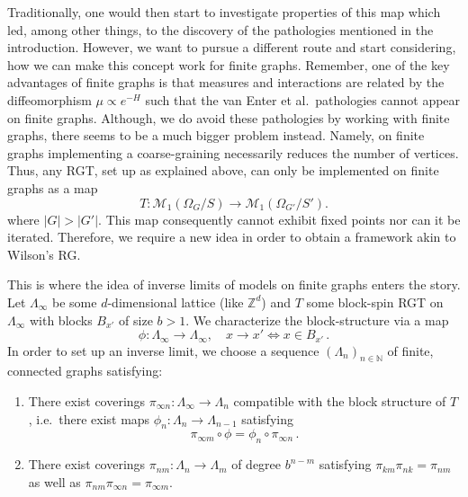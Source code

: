 \documentclass{article}
\begin{document}
Traditionally, one would then start to investigate properties of this map which led, among other things, to the discovery of the pathologies mentioned in the introduction. However, we want to pursue a different route and start considering, how we can make this concept work for finite graphs. Remember, one of the key advantages of finite graphs is that measures and interactions are related by the diffeomorphism $\mu\propto e^{-H}$ such that the van Enter et al.\ pathologies cannot appear on finite graphs. Although, we do avoid these pathologies by working with finite graphs, there seems to be a much bigger problem instead. Namely, on finite graphs implementing a coarse-graining necessarily reduces the number of vertices. Thus, any RGT, set up as explained above, can only be implemented on finite graphs as a map
\begin{equation}
    T:\mathscr{M}_1(\Omega_G/S)\to\mathscr{M}_1(\Omega_{G'}/S').
\end{equation}
where $|G|>|G'|$. This map consequently cannot exhibit fixed points nor can it be iterated. Therefore, we require a new idea in order to obtain a framework akin to Wilson's RG.\medskip

This is where the idea of inverse limits of models on finite graphs enters the story. Let $\Lambda_\infty$ be some $d$-dimensional lattice (like $\mathds{Z}^d$) and $T$ some block-spin RGT on $\Lambda_\infty$ with blocks $B_{x'}$ of size $b>1$. We characterize the block-structure via a map
\begin{equation}
    \phi:\Lambda_\infty\to\Lambda_\infty,\quad x\to x'\iff x\in B_{x'}\,.
\end{equation}
In order to set up an inverse limit, we choose a sequence $(\Lambda_n)_{n\in\mathds{N}}$ of finite, connected graphs satisfying:
\begin{enumerate}
    \item[i)] There exist coverings $\pi_{\infty n}:\Lambda_\infty\to\Lambda_n$ compatible with the block structure of $T$, i.e.\ there exist maps $\phi_n:\Lambda_n\to\Lambda_{n-1}$ satisfying
    \begin{equation}
        \pi_{\infty m}\circ\phi=\phi_n\circ\pi_{\infty n}\,.
    \end{equation}
    \item[ii)] There exist coverings $\pi_{nm}:\Lambda_n\to\Lambda_m$ of degree $b^{n-m}$ satisfying $\pi_{km}\pi_{nk}=\pi_{nm}$ as well as $\pi_{nm}\pi_{\infty n}=\pi_{\infty m}$.
\end{enumerate}
\end{document}
